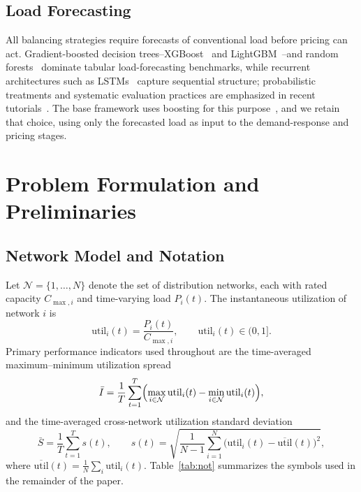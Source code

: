 \documentclass[10pt,journal]{IEEEtran}
\newcommand{\util}{\mathrm{util}}
\begin{document}
\subsection{Load Forecasting}
All balancing strategies require forecasts of conventional load before
pricing can act. Gradient-boosted decision trees--XGBoost~\cite{chen2016}
and LightGBM~\cite{ke2017}--and random forests~\cite{breiman2001} dominate
tabular load-forecasting benchmarks, while recurrent architectures such as
LSTMs~\cite{hochreiter1997} capture sequential structure; probabilistic
treatments and systematic evaluation practices are emphasized in recent
tutorials~\cite{hong2016,wang2016recency}. The base framework uses boosting
for this purpose~\cite{lepolesa2026}, and we retain that choice, using only
the forecasted load as input to the demand-response and pricing stages.

\section{Problem Formulation and Preliminaries}\label{sec:prelim}

\subsection{Network Model and Notation}
Let $\mathcal{N}=\{1,\dots,N\}$ denote the set of distribution networks,
each with rated capacity $C_{\max,i}$ and time-varying load $P_i(t)$. The
instantaneous utilization of network $i$ is
\begin{equation}\label{eq:util}
  \util_i(t)=\frac{P_i(t)}{C_{\max,i}},\qquad \util_i(t)\in(0,1].
\end{equation}
Primary performance indicators used throughout are the time-averaged
maximum--minimum utilization spread
\begin{equation}\label{eq:imb}
  \bar{I}=\frac{1}{T}\sum_{t=1}^{T}\Bigl(
    \max_{i\in\mathcal{N}}\util_i(t)-\min_{i\in\mathcal{N}}\util_i(t)\Bigr),
\end{equation}
and the time-averaged cross-network utilization standard deviation
\begin{equation}\label{eq:sid}
  \bar{S}=\frac{1}{T}\sum_{t=1}^{T}s(t),\qquad
  s(t)=\sqrt{\frac{1}{N-1}\sum_{i=1}^{N}\bigl(
    \util_i(t)-\overline{\util}(t)\bigr)^2},
\end{equation}
where $\overline{\util}(t){=}\tfrac{1}{N}\sum_i\util_i(t)$. Table~\ref{tab:not}
summarizes the symbols used in the remainder of the paper.
\end{document}
